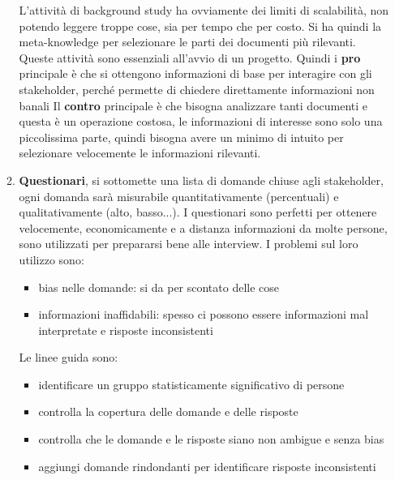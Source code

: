 \begin{itemize}
\begin{enumerate}
                        L'attività di background study ha ovviamente dei limiti di scalabilità,
                        non potendo leggere troppe cose, sia per tempo che per costo. Si ha quindi
                        la meta-knowledge per selezionare le parti dei documenti più rilevanti.
                        Queste attività sono essenziali all'avvio di un progetto.
                        Quindi i \textbf{pro} principale è che si ottengono informazioni 
                        di base per interagire con gli stakeholder, perché permette di 
                        chiedere direttamente informazioni non banali
                        Il \textbf{contro}  principale è che bisogna analizzare 
                        tanti documenti e questa è un operazione costosa, le 
                        informazioni di interesse sono solo una piccolissima parte, 
                        quindi bisogna avere un minimo di intuito per selezionare 
                        velocemente le informazioni rilevanti.
                  \item \textbf{Questionari}, si sottomette una lista di domande chiuse agli stakeholder, 
                        ogni domanda sarà misurabile quantitativamente (percentuali) 
                        e qualitativamente (alto, basso...). I questionari sono perfetti
                        per ottenere velocemente, economicamente e a distanza 
                        informazioni da molte persone, sono utilizzati per prepararsi
                        bene alle interview. I problemi sul loro utilizzo sono:
                        \begin{itemize}
                              \item bias nelle domande: si da per scontato delle cose
                              \item informazioni inaffidabili: spesso ci possono essere informazioni mal interpretate e risposte inconsistenti
                        \end{itemize}
                        Le linee guida sono:
                        \begin{itemize}
                              \item identificare un gruppo statisticamente significativo di persone 
                              \item controlla la copertura delle domande e delle risposte 
                              \item controlla che le domande e le risposte siano non ambigue e senza bias
                              \item aggiungi domande rindondanti per identificare risposte inconsistenti

\end{itemize}
\end{enumerate}
\end{itemize}
